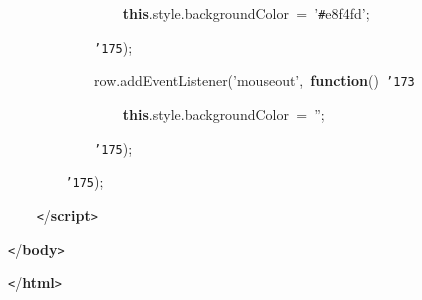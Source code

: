 \documentclass[a4paper,10pt]{article}
\def\mc{\relax}
\begin{document}
\noindent
\mbox{}{\tt\mc \ }{\tt\mc \ }{\tt\mc \ }{\tt\mc \ }{\tt\mc \ }{\tt\mc \ }{\tt\mc \ }{\tt\mc \ }{\tt\mc \ }{\tt\mc \ }{\tt\mc \ }{\tt\mc \ }{\tt\mc \ }{\tt\mc \ }{\tt\mc \ }{\tt\mc \ }\textbf{this}.style.backgroundColor{\tt\mc \ }={\tt\mc \ }'{\tt\#}e8f4fd';

\noindent
\mbox{}{\tt\mc \ }{\tt\mc \ }{\tt\mc \ }{\tt\mc \ }{\tt\mc \ }{\tt\mc \ }{\tt\mc \ }{\tt\mc \ }{\tt\mc \ }{\tt\mc \ }{\tt\mc \ }{\tt\mc \ }{\tt\char'175});

\noindent
\mbox{}{\tt\mc \ }{\tt\mc \ }{\tt\mc \ }{\tt\mc \ }{\tt\mc \ }{\tt\mc \ }{\tt\mc \ }{\tt\mc \ }{\tt\mc \ }{\tt\mc \ }{\tt\mc \ }{\tt\mc \ }row.addEventListener('mouseout',{\tt\mc \ }\textbf{function}(){\tt\mc \ }{\tt\char'173}

\noindent
\mbox{}{\tt\mc \ }{\tt\mc \ }{\tt\mc \ }{\tt\mc \ }{\tt\mc \ }{\tt\mc \ }{\tt\mc \ }{\tt\mc \ }{\tt\mc \ }{\tt\mc \ }{\tt\mc \ }{\tt\mc \ }{\tt\mc \ }{\tt\mc \ }{\tt\mc \ }{\tt\mc \ }\textbf{this}.style.backgroundColor{\tt\mc \ }={\tt\mc \ }'';

\noindent
\mbox{}{\tt\mc \ }{\tt\mc \ }{\tt\mc \ }{\tt\mc \ }{\tt\mc \ }{\tt\mc \ }{\tt\mc \ }{\tt\mc \ }{\tt\mc \ }{\tt\mc \ }{\tt\mc \ }{\tt\mc \ }{\tt\char'175});

\noindent
\mbox{}{\tt\mc \ }{\tt\mc \ }{\tt\mc \ }{\tt\mc \ }{\tt\mc \ }{\tt\mc \ }{\tt\mc \ }{\tt\mc \ }{\tt\char'175});

\noindent
\mbox{}{\tt\mc \ }{\tt\mc \ }{\tt\mc \ }{\tt\mc \ }{\tt <}/\textbf{script}{\tt >}

\noindent
\mbox{}{\tt <}/\textbf{body}{\tt >}

\noindent
\mbox{}{\tt <}/\textbf{html}{\tt >}

\rm\mc
\end{document}
